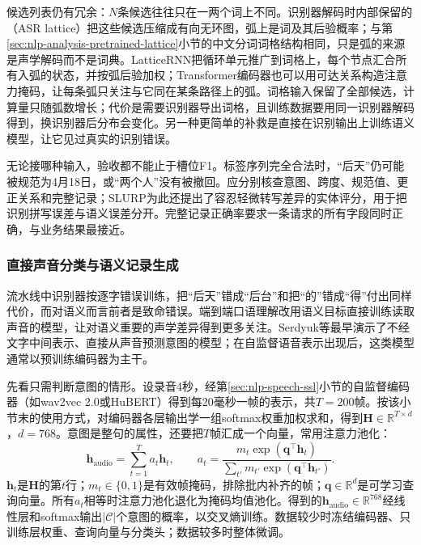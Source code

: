 候选列表仍有冗余：$N$条候选往往只在一两个词上不同。识别器解码时内部保留的（ASR lattice）把这些候选压缩成有向无环图，弧上是词及其后验概率；与第\ref{sec:nlp-analysis-pretrained-lattice}小节的中文分词词格结构相同，只是弧的来源是声学解码而不是词典。LatticeRNN把循环单元推广到词格上，每个节点汇合所有入弧的状态，并按弧后验加权；Transformer编码器也可以用可达关系构造注意力掩码，让每条弧只关注与它同在某条路径上的弧。词格输入保留了全部候选，计算量只随弧数增长；代价是需要识别器导出词格，且训练数据要用同一识别器解码得到，换识别器后分布会变化。另一种更简单的补救是直接在识别输出上训练语义模型，让它见过真实的识别错误。

无论接哪种输入，验收都不能止于槽位F1。标签序列完全合法时，“后天”仍可能被规范为4月18日，或“两个人”没有被撤回。应分别核查意图、跨度、规范值、更正关系和完整记录；SLURP为此还提出了容忍轻微转写差异的实体评分，用于把识别拼写误差与语义误差分开\cite{nlp-speech-bastianelli2020}。完整记录正确率要求一条请求的所有字段同时正确，与业务结果最接近。

\subsubsection{直接声音分类与语义记录生成}
\label{sec:nlp-speech-direct-slu}

流水线中识别器按逐字错误训练，把“后天”错成“后台”和把“的”错成“得”付出同样代价，而对语义而言前者是致命错误。端到端口语理解改用语义目标直接训练读取声音的模型，让对语义重要的声学差异得到更多关注。Serdyuk等最早演示了不经文字中间表示、直接从声音预测意图的模型；在自监督语音表示出现后，这类模型通常以预训练编码器为主干。

先看只需判断意图的情形。设录音4秒，经第\ref{sec:nlp-speech-ssl}小节的自监督编码器（如wav2vec 2.0或HuBERT）得到每20毫秒一帧的表示，共$T=200$帧。按该小节末的使用方式，对编码器各层输出学一组softmax权重加权求和，得到$\bm{H}\in\mathbb{R}^{T\times d}$，$d=768$。意图是整句的属性，还要把$T$帧汇成一个向量，常用注意力池化：
\begin{equation}
  \bm{h}_{\mathrm{audio}}=\sum_{t=1}^{T}a_t\bm{h}_t,
  \qquad
  a_t=\frac{m_t\exp(\bm{q}^{\top}\bm{h}_t)}{\sum_{t'}m_{t'}\exp(\bm{q}^{\top}\bm{h}_{t'})}.
  \label{eq:nlp-speech-slu-pooling}
\end{equation}
$\bm{h}_t$是$\bm{H}$的第$t$行；$m_t\in\{0,1\}$是有效帧掩码，排除批内补齐的帧；$\bm{q}\in\mathbb{R}^{d}$是可学习查询向量。所有$a_t$相等时注意力池化退化为掩码均值池化。得到的$\bm{h}_{\mathrm{audio}}\in\mathbb{R}^{768}$经线性层和softmax输出$|\mathcal{C}|$个意图的概率，以交叉熵训练。数据较少时冻结编码器、只训练层权重、查询向量与分类头；数据较多时整体微调。

